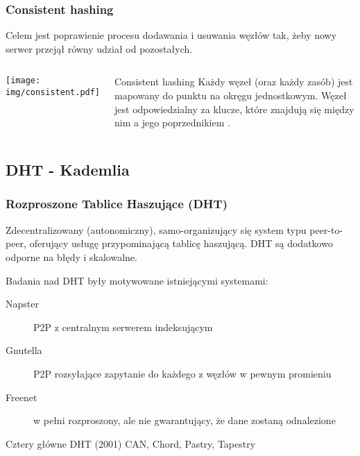 \documentclass{beamer}
\begin{document}
\begin{frame}
\frametitle{Consistent hashing}

\begin{block}{}
Celem jest poprawienie procesu dodawania i usuwania węzłów tak, żeby nowy serwer przejął równy udział od pozostałych.
\end{block}

\begin{columns}[c]

\begin{center}
\texttt{[image: img/consistent.pdf]}
\end{center}

\begin{block}{Consistent hashing}
Każdy węzeł (oraz każdy zasób) jest mapowany do punktu na okręgu jednostkowym.
Węzeł jest odpowiedzialny za klucze, które znajdują się między nim a jego poprzednikiem \citep{karger1999web}. 
\end{block}

\end{columns}

\end{frame}



\subsection{DHT - Kademlia}

\begin{frame}
\frametitle{Rozproszone Tablice Haszujące (DHT)}

\begin{block}{}
Zdecentralizowany (autonomiczny), samo-organizujący się system typu peer-to-peer, oferujący usługę przypominającą tablicę haszującą.
DHT są dodatkowo odporne na błędy i skalowalne.
\end{block}

\pause
\begin{block}{}
Badania nad DHT były motywowane istniejącymi systemami:
\begin{description}
  \item[Napster] P2P z centralnym serwerem indeksującym
  \item[Gnutella] P2P rozsyłające zapytanie do każdego z węzłów w pewnym promieniu
  \item[Freenet] w pełni rozproszony, ale nie gwarantujący, że dane zostaną odnalezione
\end{description}
\end{block}

\begin{block}{Cztery główne DHT (2001)}
CAN, Chord, Pastry, Tapestry
\end{block}

\end{frame}
\end{document}
